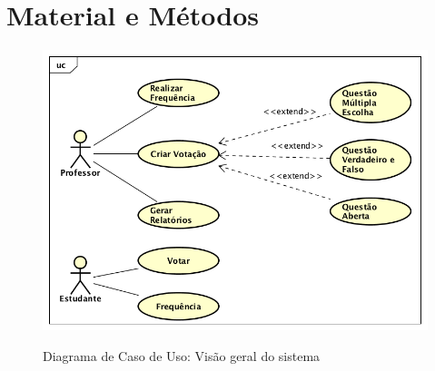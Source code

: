 \chapter{Material e Métodos}



\begin{figure}[!htb]
  \centering
  \caption{Diagrama de Caso de Uso: Visão geral do sistema}
  \includegraphics[width=.75\textwidth]{imagens/casodeuso}
  \label{fig:desenv_preco}
\end{figure}
